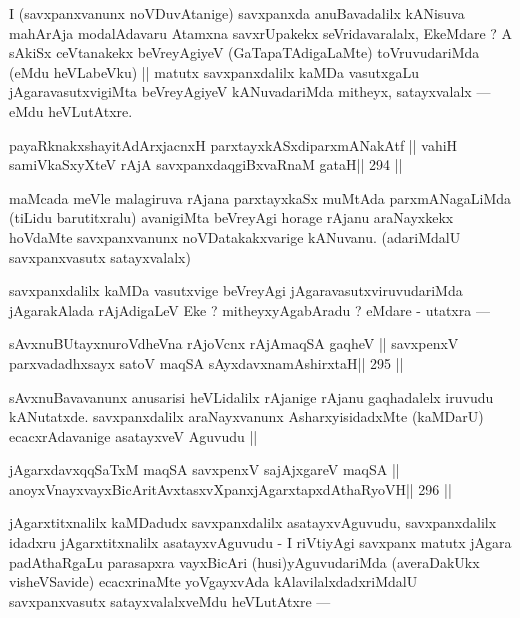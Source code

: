 \begin{artha}
I (savxpanxvanunx noVDuvAtanige) savxpanxda anuBavadalilx kANisuva mahArAja modalAdavaru Atamxna savxrUpakekx seVridavaralalx, EkeMdare ? A sAkiSx ceVtanakekx beVreyAgiyeV (GaTapaTAdigaLaMte) toVruvudariMda (eMdu heVLabeVku) || matutx savxpanxdalilx kaMDa vasutxgaLu jAgaravasutxvigiMta beVreyAgiyeV kANuvadariMda mitheyx, satayxvalalx --- eMdu heVLutAtxre.
\end{artha}

\begin{shl}
payaRknakxshayitAdArxjacnxH parxtayxkASxdiparxmANakAtf ||
vahiH samiVkaSxyXteV rAjA savxpanxdaqgiBxvaRnaM gataH\hfill || 294 ||
\end{shl}

\begin{artha}
maMcada meVle malagiruva rAjana parxtayxkaSx muMtAda parxmANagaLiMda (tiLidu barutitxralu) avanigiMta beVreyAgi horage rAjanu araNayxkekx hoVdaMte savxpanxvanunx noVDatakakxvarige kANuvanu. (adariMdalU savxpanxvasutx satayxvalalx)
\end{artha}

\begin{artha}
savxpanxdalilx kaMDa vasutxvige beVreyAgi jAgaravasutxviruvudariMda jAgarakAlada rAjAdigaLeV Eke ? mitheyxyAgabAradu ? eMdare - utatxra ---
\end{artha}

\begin{shl}
sAvxnuBUtayxnuroVdheVna rAjoVcnx rAjA\s maqSA gaqheV ||
savxpenxV parxvadadhxsayx satoV maqSA sAyxdavxnamAshirxtaH\hfill || 295 ||
\end{shl}

\begin{artha}
sAvxnuBavavanunx anusarisi heVLidalilx rAjanige rAjanu gaqhadalelx iruvudu kANutatxde. savxpanxdalilx araNayxvanunx AsharxyisidadxMte (kaMDarU) ecacxrAdavanige asatayxveV Aguvudu ||
\end{artha}

\begin{shl}
jAgarxdavxqqSaTxM maqSA savxpenxV sajAjxgareV maqSA ||
anoyxVnayxvayxBicAritAvxtasxvXpanxjAgarxtapxdAthaRyoVH\hfill || 296 ||
\end{shl}

\begin{artha}
jAgarxtitxnalilx kaMDadudx savxpanxdalilx asatayxvAguvudu, savxpanxdalilx idadxru jAgarxtitxnalilx asatayxvAguvudu - I riVtiyAgi savxpanx matutx jAgara padAthaRgaLu parasapxra vayxBicAri (husi)yAguvudariMda (averaDakUkx visheVSavide) ecacxrinaMte yoVgayxvAda kAlavilalxdadxriMdalU savxpanxvasutx satayxvalalxveMdu heVLutAtxre ---
\end{artha}

